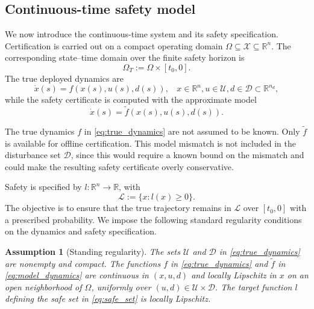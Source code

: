 \documentclass[letterpaper,10pt,conference]{ieeeconf}
\newtheorem{assumption}{Assumption}
\newcommand{\R}{\mathbb{R}}
\newcommand{\fapp}{\widetilde{f}}
\newcommand{\safe}{\mathcal{L}}
\newcommand{\xv}{x}
\newcommand{\uv}{u}
\newcommand{\dv}{d}
\newcommand{\Uv}{\mathcal{U}}
\newcommand{\Dv}{\mathcal{D}}
\newcommand{\Xrl}{\mathcal{X}}
\begin{document}



\subsection{Continuous-time safety model}

We now introduce the continuous-time system and its safety specification.
Certification is carried out on a compact operating domain
$\Omega\subseteq\Xrl\subseteq\R^n$. The corresponding state--time domain over
the finite safety horizon is
\begin{equation}
    \Omega_T:=\Omega\times[t_0,0].
    \label{eq:state_time_domain}
\end{equation}
The true deployed dynamics are
\begin{equation}
    \dot{\xv}(s)=f(\xv(s),\uv(s),\dv(s)),
    \ \ \ \ 
    \xv\in\R^n,
    \uv\in\Uv,
    \dv\in\Dv\subset\R^{n_d},
    \label{eq:true_dynamics}
\end{equation}
while the safety certificate is computed with the approximate model
\begin{equation}
    \dot{\xv}(s)=\fapp(\xv(s),\uv(s),\dv(s)).
    \label{eq:model_dynamics}
\end{equation}

The true dynamics $f$ in \eqref{eq:true_dynamics} are not assumed to be known. Only $\fapp$ is available for
offline certification. This model mismatch is not included in the disturbance set $\Dv$, since this
would require a known bound on the mismatch and could make the resulting safety
certificate overly conservative.

Safety is specified by $l:\R^n\to\R$, with
\begin{equation}
    \safe:=\{\xv:l(\xv)\ge0\}.
    \label{eq:safe_set}
\end{equation}
The objective is to ensure that the true trajectory remains in $\safe$ over $[t_0,0]$ with a prescribed probability. We
impose the following standard regularity conditions on the dynamics and safety
specification.

\begin{assumption}[Standing regularity]
\label{ass:regularity}
The sets $\Uv$ and $\Dv$ in \eqref{eq:true_dynamics} are nonempty and compact.
The functions $f$ in \eqref{eq:true_dynamics} and $\fapp$ in
\eqref{eq:model_dynamics} are continuous in $(\xv,\uv,\dv)$ and locally
Lipschitz in $\xv$ on an open neighborhood of $\Omega$, uniformly over
$(\uv,\dv)\in\Uv\times\Dv$. The target function $l$ defining the safe set in
\eqref{eq:safe_set} is locally Lipschitz.
\end{assumption}
\end{document}
